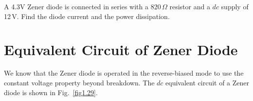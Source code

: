 \eject

\begin{example}\label{exam1.20}
A 4.3V Zener diode is connected in series with a 820\,$\Omega$ resistor and a $dc$ supply of 12\,V. Find the diode current and the power dissipation.
\end{example}


\section{Equivalent Circuit of Zener Diode}\label{sec1.25}

We know that the Zener diode is operated in the reverse-biased mode to use the constant voltage property beyond breakdown. The $dc$ equivalent circuit of a Zener diode is shown in Fig.~\ref{fig1.29}.


